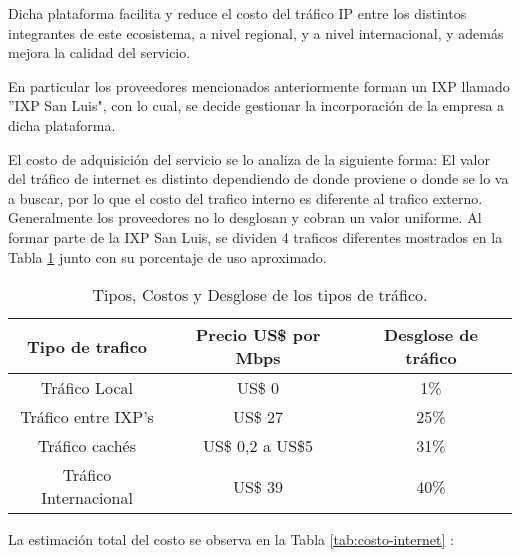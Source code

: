 \begin{itemize}
Dicha plataforma facilita y reduce el costo del tráfico IP entre los distintos integrantes de este
ecosistema, a nivel regional, y a nivel internacional, y además mejora la calidad
del servicio.

En particular los proveedores mencionados anteriormente forman un IXP llamado 
''IXP San Luis", con lo cual, se decide gestionar la incorporación de la 
empresa a dicha plataforma.

El costo de adquisición del servicio se lo analiza de la siguiente forma:
El valor del tráfico de internet es distinto dependiendo de donde proviene o 
donde se lo va a buscar, por lo que el costo del trafico interno es diferente
al trafico externo.
Generalmente los proveedores no lo desglosan y cobran un valor uniforme.
Al formar parte de la IXP San Luis, se dividen 4 traficos diferentes mostrados
en la Tabla \ref{tab:trafico} junto con su porcentaje de uso aproximado.


\begin{table}[H]
  \centering
    \begin{tabular}{|c|c|c|}
    \hline
    \rowcolor[rgb]{ .773,  .851,  .945} \textbf{Tipo de trafico} & \textbf{Precio US\$ por Mbps} & \textbf{Desglose de tráfico} \bigstrut\\
    \hline
    Tráfico Local & US\$ 0 & 1\% \bigstrut\\
    \hline
    Tráfico entre IXP's & US\$ 27 & 25\% \bigstrut\\
    \hline
    Tráfico cachés & US\$ 0,2 a US\$5 & 31\% \bigstrut\\
    \hline
    Tráfico Internacional & US\$ 39 & 40\% \bigstrut\\
    \hline
    \end{tabular}%
	\caption{Tipos, Costos y Desglose de los tipos de tráfico.}
  \label{tab:trafico}%
\end{table}%

La estimación total del costo se observa en la Tabla \ref{tab:costo-internet} :





\end{itemize}

